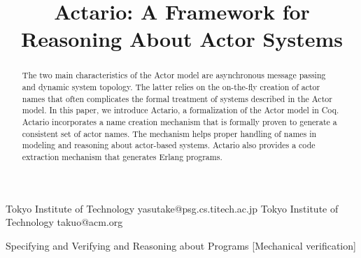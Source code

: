 \documentclass[10pt]{sigplanconf}
\begin{document}
\setlength{\pdfpageheight}{\paperheight}
\setlength{\pdfpagewidth}{\paperwidth}






\title{Actario: A Framework for Reasoning About Actor Systems}

           {Tokyo Institute of Technology}
           {yasutake@psg.cs.titech.ac.jp}
           {Tokyo Institute of Technology}
           {takuo@acm.org}

\maketitle

\begin{abstract}
The two main characteristics of the Actor model are asynchronous message passing and dynamic system topology. The latter relies on the on-the-fly creation of actor names that often complicates the formal treatment of systems described in the Actor model. In this paper, we introduce Actario, a formalization of the Actor model in Coq. Actario incorporates a name creation mechanism that is formally proven to generate a consistent set of actor names. The mechanism helps proper handling of names in modeling and reasoning about actor-based systems. Actario also provides a code extraction mechanism that generates Erlang programs.
\end{abstract}

%
{Specifying and Verifying and Reasoning about Programs}%
[Mechanical verification]
\end{document}
